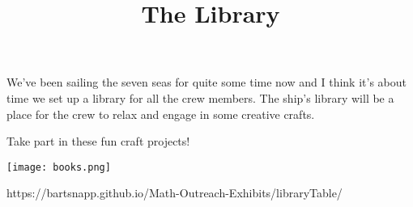 \documentclass{../exhibit}
\title{The Library}
\begin{document}
\begin{context} We've been sailing the seven seas for quite some time
now and I think it's about time we set up a library for all the crew
members. The ship's library will be a place for the crew to relax and
engage in some creative crafts.
\end{context}

\begin{directions} Take part in these fun craft projects!
\end{directions}

\begin{example}%
  \begin{center}
    \texttt{[image: books.png]}
  \end{center}
\end{example}

\begin{mathConnections}
  https://bartsnapp.github.io/Math-Outreach-Exhibits/libraryTable/
\end{mathConnections}
\end{document}
